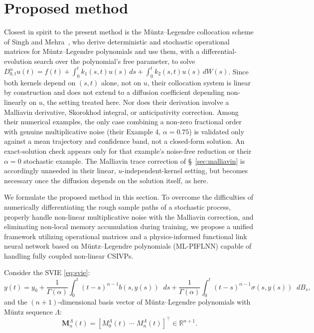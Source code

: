 \documentclass[11pt, a4paper]{article}
\theoremstyle{theoremstyle}
\theoremstyle{definitionstyle}
\newcommand{\dd}{\mathop{}\!d}
\begin{document}
\section{Proposed method}\label{sec:proposed_method}
Closest in spirit to the present method is the M\"untz--Legendre collocation scheme of Singh and Mehra~\cite{singhmehra2023parameter}, who derive deterministic and stochastic operational matrices for M\"untz--Legendre polynomials and use them, with a differential-evolution search over the polynomial's free parameter, to solve $D^\alpha_{0,t} u(t) = f(t) + \int_0^t k_1(s,t)u(s)\,ds + \int_0^t k_2(s,t)u(s)\,dW(s)$. Since both kernels depend on $(s,t)$ alone, not on $u$, their collocation system is linear by construction and does not extend to a diffusion coefficient depending non-linearly on $u$, the setting treated here. Nor does their derivation involve a Malliavin derivative, Skorokhod integral, or anticipativity correction. Among their numerical examples, the only case combining a non-zero fractional order with genuine multiplicative noise (their Example 4, $\alpha = 0.75$) is validated only against a mean trajectory and confidence band, not a closed-form solution. An exact-solution check appears only for that example's noise-free reduction or their $\alpha = 0$ stochastic example. The Malliavin trace correction of \S~\ref{sec:malliavin} is accordingly unneeded in their linear, $u$-independent-kernel setting, but becomes necessary once the diffusion depends on the solution itself, as here.

We formulate the proposed method in this section. To overcome the difficulties of numerically differentiating the rough sample paths of a stochastic process, properly handle non-linear multiplicative noise with the Malliavin correction, and eliminating non-local memory accumulation during training, we propose a unified framework utilizing operational matrices and a physics-informed functional link neural network based on M\"untz--Legendre polynomials (ML-PIFLNN) capable of handling fully coupled non-linear CSIVPs.

Consider the SVIE \eqref{eq:svie}:
\begin{equation}
    y(t) = y_0 + \frac 1{\Gamma(\alpha)}\int_0^t (t - s)^{\alpha - 1}b(s, y(s))\dd{s} + \frac 1{\Gamma(\alpha)}\int_0^t (t - s)^{\alpha - 1}\sigma(s, y(s))\dd{B_s},
\end{equation}
and the $(n+1)$-dimensional basis vector of M\"untz--Legendre polynomials with M\"untz sequence $\Lambda$:
\begin{equation}
    \mathbf M^\Lambda_n(t) = [M_0^\Lambda(t) \; \cdots \; M^\Lambda_n(t)]^\top \in \mathbb R^{n+1}.
\end{equation}
\end{document}
